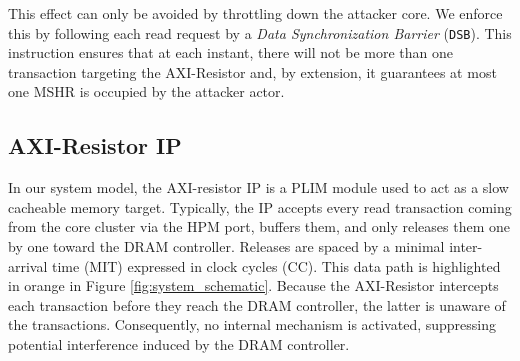         This effect can only be avoided by throttling down the attacker core.
        We enforce this by following each read request by a \emph{Data Synchronization Barrier} (\texttt{DSB}).
        This instruction ensures that at each instant, there will not be more than one transaction targeting the AXI-Resistor and, by extension, it guarantees at most one MSHR is occupied by the attacker actor.

    \subsection{AXI-Resistor IP}
        \label{subsec:axi-resistor}
%

        In our system model, the AXI-resistor IP is a PLIM module \cite{PLIM20} used to act as a slow cacheable memory target.
        Typically, the IP accepts every read transaction coming from the core cluster via the HPM port, buffers them, and only releases them one by one toward the DRAM controller.
        Releases are spaced by a minimal inter-arrival time (MIT) expressed in clock cycles (CC).
        This data path is highlighted in orange in Figure \ref{fig:system_schematic}.
        Because the AXI-Resistor intercepts each transaction before they reach the DRAM controller, the latter is unaware of the transactions. Consequently, no internal mechanism is activated, suppressing potential interference induced by the DRAM controller.

